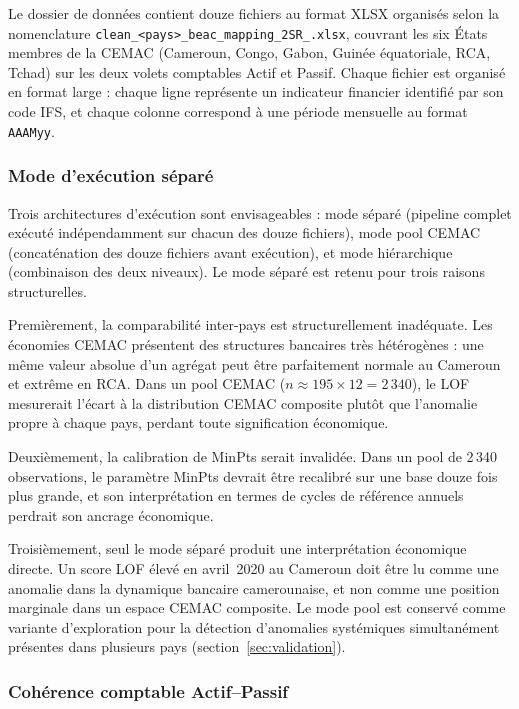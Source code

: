 \documentclass[12pt,a4paper]{article}
\begin{document}
Le dossier de données contient douze fichiers au format XLSX organisés selon
la nomenclature \texttt{clean\_<pays>\_beac\_mapping\_2SR\_<Actif|Passif>.xlsx},
couvrant les six États membres de la CEMAC (Cameroun, Congo, Gabon, Guinée
équatoriale, RCA, Tchad) sur les deux volets comptables Actif et Passif.
Chaque fichier est organisé en format large : chaque ligne représente un
indicateur financier identifié par son code IFS, et chaque colonne correspond
à une période mensuelle au format \texttt{AAAMyy}.

\subsubsection{Mode d'exécution séparé}

Trois architectures d'exécution sont envisageables : mode séparé (pipeline
complet exécuté indépendamment sur chacun des douze fichiers), mode pool
CEMAC (concaténation des douze fichiers avant exécution), et mode
hiérarchique (combinaison des deux niveaux). Le mode séparé est retenu pour
trois raisons structurelles.

Premièrement, la comparabilité inter-pays est structurellement inadéquate.
Les économies CEMAC présentent des structures bancaires très hétérogènes :
une même valeur absolue d'un agrégat peut être parfaitement normale au
Cameroun et extrême en RCA. Dans un pool CEMAC ($n \approx 195 \times 12 =
2\,340$), le LOF mesurerait l'écart à la distribution CEMAC composite plutôt
que l'anomalie propre à chaque pays, perdant toute signification économique.

Deuxièmement, la calibration de MinPts serait invalidée. Dans un pool de
2\,340 observations, le paramètre MinPts devrait être recalibré sur une base
douze fois plus grande, et son interprétation en termes de cycles de référence
annuels perdrait son ancrage économique.

Troisièmement, seul le mode séparé produit une interprétation économique
directe. Un score LOF élevé en avril~2020 au Cameroun doit être lu comme une
anomalie dans la dynamique bancaire camerounaise, et non comme une position
marginale dans un espace CEMAC composite. Le mode pool est conservé comme
variante d'exploration pour la détection d'anomalies systémiques simultanément
présentes dans plusieurs pays (section~\ref{sec:validation}).

\subsubsection{Cohérence comptable Actif--Passif}
\end{document}
